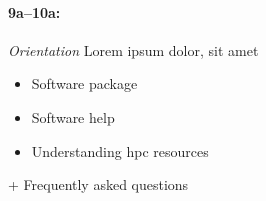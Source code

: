 \paragraph{9a--10a:}
\textit{Orientation}
Lorem ipsum dolor, sit amet

\begin{itemize}
    \item Software package
    \item Software help
    \item Understanding hpc resources
\end{itemize}

  + Frequently asked questions


